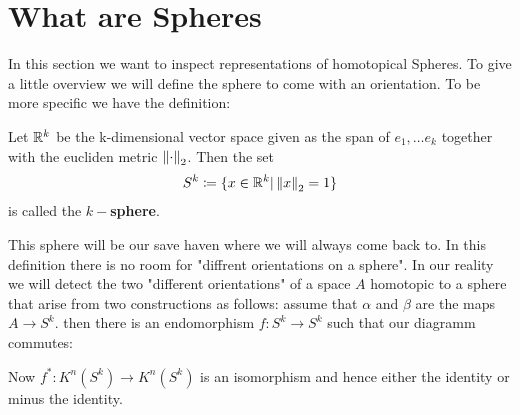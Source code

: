 \section{What are Spheres}
In this section we want to inspect representations of homotopical Spheres. To give a little overview we will define the sphere to come with an orientation. To be more specific we have the definition:
\begin{definition}
	Let $\mathbb{R}^k$ be the k-dimensional vector space given as the span of $e_1,\dots e_k$ together with the eucliden metric $\left\lVert\cdot\right\rVert_2$. Then the set
	\begin{align*}
		S^k\coloneq \{x\in \mathbb{R}^k|\left\lVert x\right\rVert_2=1 \}
	\end{align*} is called the \textbf{$k-$sphere}.
\end{definition} This sphere will be our save haven where we will always come back to. In this definition there is no room for "diffrent orientations on a sphere". In our reality we will detect the two  "different orientations" of a space $A$ homotopic to a sphere that arise from two constructions as follows: assume that $\alpha$ and $\beta$ are the maps $A\to S^k$. then there is an endomorphism $f: S^k\to S^k$ such that our diagramm commutes:
\begin{center}
\end{center}
 Now $f^*:K^n(S^k)\to K^n(S^k)$ is an isomorphism and hence either the identity or minus the identity.
 
